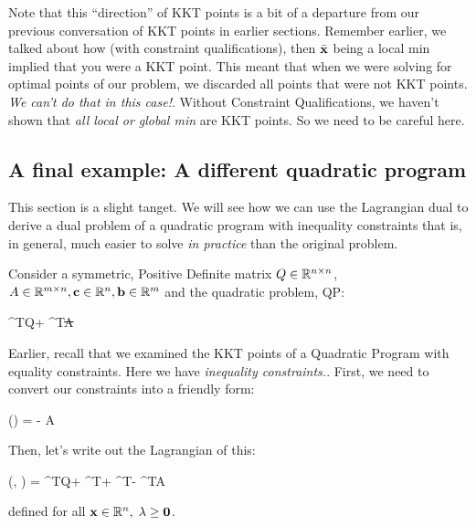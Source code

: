 Note that this ``direction'' of KKT points is a bit of a departure from our 
previous conversation of KKT points in earlier sections. 
Remember earlier, we talked about how (with constraint qualifications),
then $\bar{\mathbf{x}}$ being a local min implied that you were a KKT point. This meant that
when we were solving for optimal points of our problem, we discarded all points that
were not KKT points. \textit{We can't do that in this case!}. Without 
Constraint Qualifications, we haven't shown that \textit{all local or global min}
are KKT points. So we need to be careful here.


\subsection{A final example: A different quadratic program}

This section is a slight tanget. We will see how we can use
the Lagrangian dual to derive a dual problem of a quadratic program with
inequality constraints that is, in general, much easier 
to solve \textit{in practice} than the original problem.

Consider a symmetric, Positive Definite matrix $Q \in \mathbb{R}^{n \times n}$,
$A \in \mathbb{R}^{m \times n}, \mathbf{c} \in \mathbb{R}^n, \mathbf{b} \in \mathbb{R}^m$ and
the quadratic problem, QP:
\begin{frml}
	\min {}\vx^TQ\vx + \vc^T\vx \st A\vx \geq \vb
\end{frml}

Earlier, recall that we examined the KKT points of a Quadratic Program with
equality constraints. Here we have \textit{inequality constraints.}. First,
we need to convert our constraints into a friendly form:
\begin{frml}
	\vg(\vx) = \vb - A\vx \leq \vzero
\end{frml}
Then, let's
write out the Lagrangian of this:
\begin{frml}
	(\vx, \lambda) = \vx^TQ\vx + \vc^T\vx + \lambda^T\vb -
	\lambda^TA\vx
\end{frml}
defined for all $\mathbf{x} \in \mathbb{R}^n, \; \lambda \geq \mathbf{0}$.

